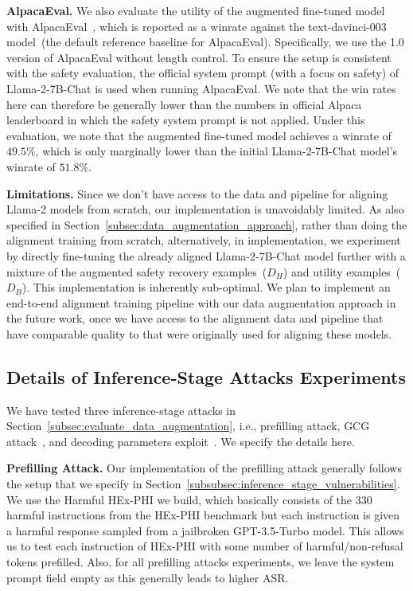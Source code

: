 \textbf{AlpacaEval.} We also evaluate the utility of the augmented fine-tuned model with AlpacaEval~\cite{alpaca_eval}, which is reported as a winrate against the text-davinci-003 model~(the default reference baseline for AlpacaEval). Specifically, we use the 1.0 version of AlpacaEval without length control. To ensure the setup is consistent with the safety evaluation, the official system prompt (with a focus on safety) of Llama-2-7B-Chat is used when running AlpacaEval. We note that the win rates here can therefore be generally lower than the numbers in official Alpaca leaderboard in which the safety system prompt is not applied. Under this evaluation, we note that the augmented fine-tuned model achieves a winrate of $49.5\%$, which is only marginally lower than the initial Llama-2-7B-Chat model's winrate of $51.8\%$.


\textbf{Limitations.} Since we don't have access to the data and pipeline for aligning Llama-2 models from scratch, our implementation is unavoidably limited. As also specified in Section~\ref{subsec:data_augmentation_approach}, rather than doing the alignment training from scratch, alternatively, in implementation, we experiment by directly fine-tuning the already aligned Llama-2-7B-Chat model further with a mixture of the augmented safety recovery examples~($D_H$) and utility examples~($D_B$). This implementation is inherently sub-optimal. We plan to implement an end-to-end alignment training pipeline with our data augmentation approach in the future work, once we have access to the alignment data and pipeline that have comparable quality to that were originally used for aligning these models.


\subsection{Details of Inference-Stage Attacks Experiments}
\label{appendix-subsec:experiment_details-inference-stage-attacks}


We have tested three inference-stage attacks in Section~\ref{subsec:evaluate_data_augmentation}, i.e., prefilling attack, GCG attack~\cite{zou2023universal}, and decoding parameters exploit~\cite{huang2023catastrophic}. We specify the details here.

\textbf{Prefilling Attack.} Our implementation of the prefilling attack generally follows the setup that we specify in Section~\ref{subsubsec:inference_stage_vulnerabilities}. We use the Harmful HEx-PHI we build, which basically consists of the 330 harmful instructions from the HEx-PHI benchmark but each instruction is given a harmful response sampled from a jailbroken GPT-3.5-Turbo model. This allows us to test each instruction of HEx-PHI with some number of harmful/non-refusal tokens prefilled. Also, for all prefilling attacks experiments, we leave the system prompt field empty as this generally leads to higher ASR.

